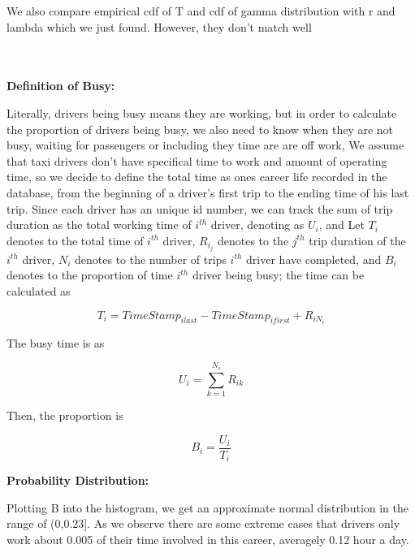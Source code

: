 \documentclass[11pt]{article}
\begin{document}
\par
We also compare empirical cdf of T and cdf of gamma distribution with r and lambda which we just found. However, they don’t match well 

\\\\
\textbf{Definition of Busy:}

\par
Literally, drivers being busy means they are working, but in order to calculate the proportion of drivers being busy, we also need to know when they are not busy, waiting for passengers or including they time are are off work, We assume that taxi drivers don’t have specifical time to work and amount of operating time, so we decide to define the total time as ones career life recorded in the database, from the beginning of a driver’s first trip to the ending time of his last trip. Since each driver has an unique id number, we can track the sum of trip duration as the total working time 
of $i^{th}$ driver, denoting as $U_{i}$, and Let $T_i$ denotes to the total time of $i^{th}$ driver, $R_{i_j}$ denotes to the $j^{th}$ trip duration of the $i^{th}$ driver, $N_i$ denotes to the number of trips $i^{th}$ driver have completed, and $B_i$ denotes to the proportion of time $i^{th}$ driver being busy; the time can be calculated as

\begin{equation}
T_i =TimeStamp_{i last}-TimeStamp_{i first} +R_{iN_i}
\end{equation}

\par
The busy time is as

\begin{equation}
U_i = \sum_{k=1}^{N_i} R_{ik}
\end{equation}

\par
Then, the proportion is

\begin{equation}
B_i = \frac{U_i}{T_i}
\end{equation}

\textbf{Probability Distribution:}
\par
Plotting B into the histogram, we get an approximate normal distribution in the range of (0,0.23]. As we observe there are some extreme cases that drivers only work about 0.005 of their time involved in this career, averagely 0.12 hour a day.
\end{document}
